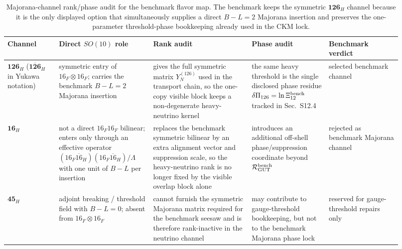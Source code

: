 \documentclass[11pt]{article}
\begin{document}
\begin{table}[t]
\centering
\scriptsize
\setlength{\tabcolsep}{3pt}
\renewcommand{\arraystretch}{1.12}
\begin{tabular}{@{}>{\raggedright\arraybackslash}p{0.12\linewidth}>{\raggedright\arraybackslash}p{0.22\linewidth}>{\raggedright\arraybackslash}p{0.23\linewidth}>{\raggedright\arraybackslash}p{0.18\linewidth}>{\raggedright\arraybackslash}p{0.17\linewidth}@{}}
\toprule
Channel & Direct $SO(10)$ role & Rank audit & Phase audit & Benchmark verdict \\
\midrule
$\mathbf{126}_H$ ($\overline{\mathbf{126}}_H$ in Yukawa notation) & symmetric entry of $16_F\otimes16_F$; carries the benchmark $B-L=2$ Majorana insertion & gives the full symmetric matrix $Y_N^{(126)}$ used in the transport chain, so the one-copy visible block keeps a non-degenerate heavy-neutrino kernel & the same heavy threshold is the single disclosed phase residue $\delta\Pi_{126}=\ln\Xi_{12}^{\rm bench}$ tracked in Sec.~S12.4 & selected benchmark channel \\

$\mathbf{16}_H$ & not a direct $16_F16_F$ bilinear; enters only through an effective operator $(16_F\overline{16}_H)(16_F\overline{16}_H)/\Lambda$ with one unit of $B-L$ per insertion & replaces the benchmark symmetric bilinear by an extra alignment vector and suppression scale, so the heavy-neutrino rank is no longer fixed by the visible overlap block alone & introduces an additional off-shell phase/suppression coordinate beyond $\mathcal R_{\rm GUT}^{\rm bench}$ & rejected as benchmark Majorana channel \\

$\mathbf{45}_H$ & adjoint breaking / threshold field with $B-L=0$; absent from $16_F\otimes16_F$ & cannot furnish the symmetric Majorana matrix required for the benchmark seesaw and is therefore rank-inactive in the neutrino channel & may contribute to gauge-threshold bookkeeping, but not to the benchmark Majorana phase lock & reserved for gauge-threshold repairs only \\
\bottomrule
\end{tabular}
\caption{Majorana-channel rank/phase audit for the benchmark flavor map. The benchmark keeps the symmetric $\mathbf{126}_H$ channel because it is the only displayed option that simultaneously supplies a direct $B-L=2$ Majorana insertion and preserves the one-parameter threshold-phase bookkeeping already used in the CKM lock.}
\label{tab:s12-majorana-channel-audit}
\end{table}
\end{document}
